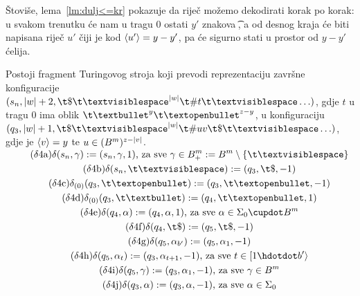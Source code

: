 Štoviše, lema~\ref{lm:dulj<=kr} pokazuje da riječ možemo dekodirati korak po korak: u svakom trenutku će nam u tragu $0$ ostati $y'$ znakova \t\textbullet, a od desnog kraja će biti napisana riječ $u'$ čiji je kod $\langle u'\rangle=y-y'$, pa će sigurno stati u prostor od $y-y'$ ćelija.

\begin{lema}[{name=[četvrti fragment transpiliranog stroja]}]\label{lm:faza4}
Postoji fragment Turingovog stroja koji prevodi reprezentaciju završne konfiguracije $(s_n,\dulj w+2,\t\$\bl^{\dulj w}\t\#t\bl\ldots)$, gdje $t$ u tragu $0$ ima oblik $\t\textbullet^y\t\textopenbullet^{z-y}$, u konfiguraciju $(q_3,\dulj w+1,\t\$\bl^{\dulj w}\t\#uv\t\$\bl\ldots)$, gdje je $\langle v\rangle=y$ te $u\in(B^m)^{z-\lvert v\rvert}$.
\end{lema}
\noindent\begin{gather*}
\SwapAboveDisplaySkip
\label{d:71}\tag{$\delta$4a}\delta(s_n,\gamma):=(s_n,\gamma,1)\text{, za sve } \gamma\in B^m_+:=B^m\setminus\{\bl\}\\
\label{d:72}\tag{$\delta$4b}\delta(s_n,\bl):=(q_3,\t\$,-1)\\
\label{d:73}\tag{$\delta$4c}\delta_{(0)}(q_3,\t\textopenbullet):=(q_3,\t\textopenbullet,-1)\\
\label{d:74}\tag{$\delta$4d}\delta_{(0)}(q_3,\t\textbullet):=(q_4,\t\textopenbullet,1)\\
\label{d:75}\tag{$\delta$4e}\delta(q_4,\alpha):=(q_4,\alpha,1)\text{, za sve }\alpha\in\Sigma_0\dcup B^m\\
\label{d:76}\tag{$\delta$4f}\delta(q_4,\t\$):=(q_5,\t\$,-1)\\
\label{d:77}\tag{$\delta$4g}\delta(q_5,\alpha_{b'}):=(q_5,\alpha_1,-1)\\
\label{d:78}\tag{$\delta$4h}\delta(q_5,\alpha_t):=(q_3,\alpha_{t+1},-1)\text{, za sve }t\in[1\dd b'\rangle\\
\label{d:79}\tag{$\delta$4i}\delta(q_5,\gamma):=(q_3,\alpha_1,-1)\text{, za sve }\gamma\in B^m\\
\label{d:70}\tag{$\delta$4j}\delta(q_3,\alpha):=(q_3,\alpha,-1)\text{, za sve }\alpha\in\Sigma_0
\end{gather*}

